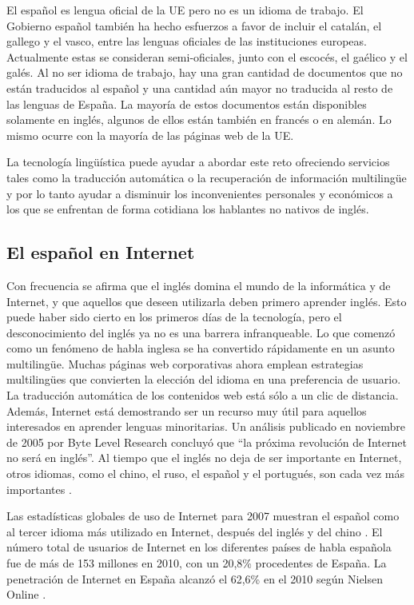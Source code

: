 \begin{multicols}{2}
El español es lengua oficial de la UE pero no es un idioma de trabajo. El Gobierno español también ha hecho esfuerzos a favor de incluir el catalán, el gallego y el vasco, entre las lenguas oficiales de las instituciones europeas. Actualmente estas se consideran semi-oficiales, junto con el escocés, el gaélico y el galés. Al no ser idioma de trabajo, hay una gran cantidad de documentos que no están traducidos al español y una cantidad aún mayor no traducida al resto de las lenguas de España. La mayoría de estos documentos están disponibles solamente en inglés, algunos de ellos están también en francés o en alemán. Lo mismo ocurre con la mayoría de las páginas web de la UE.

La tecnología lingüística puede ayudar a abordar este reto ofreciendo servicios tales como la traducción automática o la recuperación de información multilingüe y por lo tanto ayudar a disminuir los inconvenientes personales y económicos a los que se enfrentan de forma cotidiana los hablantes no nativos de inglés.

\subsection{El español en Internet}

Con frecuencia se afirma que el inglés domina el mundo de la informática y de Internet, y que aquellos que deseen utilizarla deben primero aprender inglés. Esto puede haber sido cierto en los primeros días de la tecnología, pero el desconocimiento del inglés ya no es una barrera infranqueable. Lo que comenzó como un fenómeno de habla inglesa se ha convertido rápidamente en un asunto multilingüe. Muchas páginas web corporativas ahora emplean estrategias multilingües que convierten la elección del idioma en una preferencia de usuario. La traducción automática de los contenidos web está sólo a un clic de distancia. Además, Internet está demostrando ser un recurso muy útil para aquellos interesados en aprender lenguas minoritarias. Un análisis publicado en noviembre de 2005 por Byte Level Research concluyó que "`la próxima revolución de Internet no será en inglés"'. Al tiempo que el inglés no deja de ser  importante en Internet, otros idiomas, como el chino, el ruso, el español y el portugués, son cada vez  más importantes \cite{espanolred} \cite{britishcouncil}.

Las estadísticas globales de uso de Internet para 2007 muestran el español como al tercer idioma más utilizado en Internet, después del inglés y del chino \cite{internetworldstats}. El número total de usuarios de Internet en los diferentes países de habla española fue de más de 153 millones en 2010, con un 20,8\% procedentes de España. La penetración de Internet en España alcanzó el 62,6\% en el 2010 según Nielsen Online \cite{nielsen}. 


\end{multicols}
